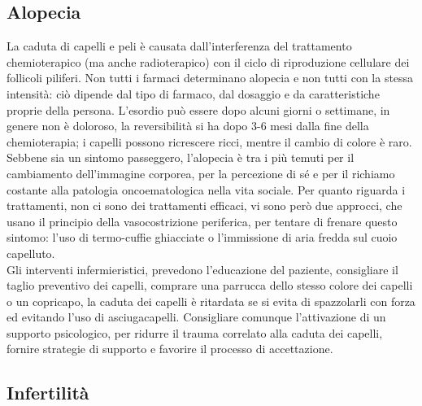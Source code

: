 \subsection{Alopecia}

La caduta di capelli e peli è causata dall’interferenza del trattamento chemioterapico (ma anche radioterapico) con 
il ciclo di riproduzione cellulare dei follicoli piliferi. Non tutti i farmaci determinano alopecia e non tutti con 
la stessa intensità: ciò dipende dal tipo di farmaco, dal dosaggio e da caratteristiche proprie della persona. 
L’esordio può essere dopo alcuni giorni o settimane, in genere non è doloroso, la reversibilità si ha dopo 3-6 mesi 
dalla fine della chemioterapia; i capelli possono ricrescere ricci, mentre il cambio di colore è raro. 
Sebbene sia un sintomo passeggero, l’alopecia è tra i più temuti per il cambiamento dell’immagine corporea, 
per la percezione di sé e per il richiamo costante alla patologia oncoematologica nella vita sociale. 
Per quanto riguarda i trattamenti, non ci sono dei trattamenti efficaci, vi sono però due approcci, che usano il 
principio della vasocostrizione periferica, per tentare di frenare questo sintomo:
l’uso di termo-cuffie ghiacciate o l’immissione di aria fredda sul cuoio capelluto.\\
Gli interventi infermieristici, prevedono l’educazione del paziente, consigliare il taglio preventivo dei capelli, 
comprare una parrucca dello stesso colore dei capelli o un copricapo, la caduta dei capelli è ritardata se si evita 
di spazzolarli con forza ed evitando l’uso di asciugacapelli. Consigliare comunque l’attivazione di un supporto 
psicologico, per ridurre il trauma correlato alla caduta dei capelli, fornire strategie di supporto e favorire 
il processo di accettazione. %

\subsection{Infertilità}

